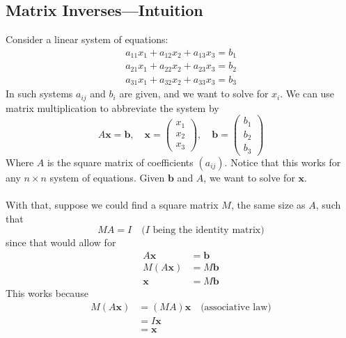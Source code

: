 \documentclass{report}
\begin{document}
\subsection{Matrix Inverses---Intuition} %
Consider a linear system of equations:
\begin{align*}
a_{11}x_1+a_{12}x_2+a_{13}x_3=b_1\\
a_{21}x_1+a_{22}x_2+a_{23}x_3=b_2\\
a_{31}x_1+a_{32}x_2+a_{33}x_3=b_3
\end{align*}
In such systems $a_{ij}$ and $b_i$ are given, and we want to solve for $x_i$. 
We can use matrix multiplication to abbreviate the system by
\begin{equation*}
A\mathbf{x=b},\quad
\mathbf{x}=
\begin{pmatrix}
x_1\\x_2\\x_3
\end{pmatrix},\quad
\mathbf{b}=
\begin{pmatrix}
b_1\\b_2\\b_3
\end{pmatrix}
\end{equation*}
Where $A$ is the square matrix of coefficients $(a_{ij})$. Notice that this works 
for any $n\times n$ system of equations. Given $\mathbf{b}$ and $A$, we want to solve for $\mathbf{x}$.\\
\vspace{1mm}\\
With that, suppose we could find a square matrix $M$, the same size as $A$, such that
\begin{equation*}
MA=I\quad\text{($I$ being the identity matrix)}
\end{equation*}
since that would allow for
\begin{align*}
A\mathbf{x}&=\mathbf{b}\\
M(A\mathbf{x})&=M\mathbf{b}\\
\mathbf{x}&=M\mathbf{b}
\end{align*}
This works because
\begin{align*}
M(A\mathbf{x})&=(MA)\mathbf{x}\quad\text{(associative law)}\\
&=I\mathbf{x}\\
&=\mathbf{x}
\end{align*}
\newpage
\end{document}
